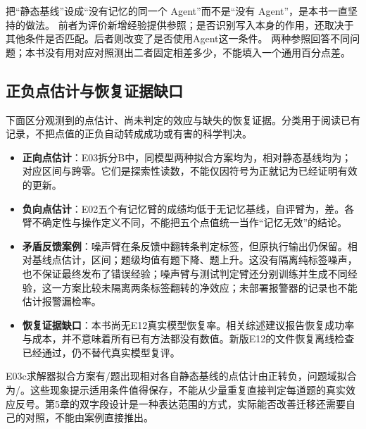 \begin{pitfallbox}
把“静态基线”设成“没有记忆的同一个 Agent”而不是“没有 Agent”，是本书一直坚持的做法。
前者为评价新增经验提供参照；是否识别写入本身的作用，还取决于其他条件是否匹配。后者则改变了是否使用Agent这一条件。
两种参照回答不同问题；本书没有用对应对照测出二者固定相差多少，不能填入一个通用百分点差。
\end{pitfallbox}

\subsection{正负点估计与恢复证据缺口}
\label{sec:ch15-cases}

\begin{sloppypar}
下面区分观测到的点估计、尚未判定的效应与缺失的恢复证据。分类用于阅读已有记录，不把点值的正负自动转成成功或有害的科学判决。
\end{sloppypar}

\begin{itemize}
  \item \begin{sloppypar}\textbf{正向点估计}：E03拆分B中，同模型两种拟合方案均为，相对静态基线均为；对应区间\measured{$[-0.1125,+0.1250]$}与\measured{$[-0.1500,+0.1625]$}跨零。它们是探索性读数，不能仅因符号为正就记为已经证明有效的更新。\end{sloppypar}
  \item \textbf{负向点估计}：E02五个有记忆臂的成绩均低于无记忆基线，自评臂为，差。各臂不确定性与操作定义不同，不能把五个点值统一当作“记忆无效”的结论。
  \item \textbf{矛盾反馈案例}：噪声臂在条反馈中翻转条判定标签，但原执行输出仍保留。相对基线点估计，区间\measured{$[-0.3125,+0.0125]$}；题级均值有题下降、题上升。这没有隔离纯标签噪声，也不保证最终发布了错误经验；噪声臂与测试判定臂还分别训练并生成不同经验，这一方案比较未隔离两条标签翻转的净效应；未部署报警器的记录也不能估计报警漏检率。
  \item \textbf{恢复证据缺口}：本书尚无E12真实模型恢复率。相关综述建议报告恢复成功率与成本\cite{coding-survey-2608}，并不意味着所有已有方法都没有数值。新版E12的文件恢复离线检查已经通过，仍不替代真实模型复评。
\end{itemize}

\begin{sloppypar}
E03c求解器拟合方案有/题出现相对各自静态基线的点估计由正转负，问题域拟合为/。这些现象提示适用条件值得保存，不能从少量重复直接判定每道题的真实效应反号。第5章的双字段设计是一种表达范围的方式，实际能否改善迁移还需要自己的对照，不能由案例直接推出。
\end{sloppypar}

